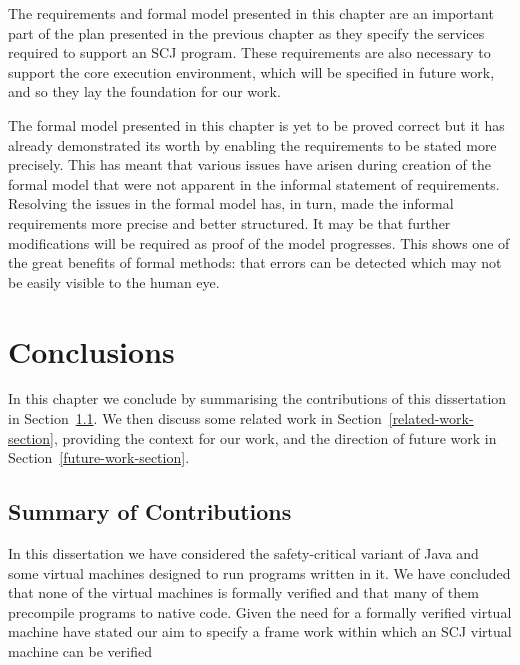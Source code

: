 \documentclass[a4paper,10pt]{report}
\begin{document}
The requirements and formal model presented in this chapter are an important
part of the plan presented in the previous chapter as they specify the services
required to support an SCJ program.  These requirements are also necessary to
support the core execution environment, which will be specified in future work,
and so they lay the foundation for our work.

The formal model presented in this chapter is yet to be proved correct but it
has already demonstrated its worth by enabling the requirements to be stated
more precisely.  This has meant that various issues have arisen during creation
of the formal model that were not apparent in the informal statement of
requirements.  Resolving the issues in the formal model has, in turn, made the
informal requirements more precise and better structured.  It may be that
further modifications will be required as proof of the model progresses.  This
shows one of the great benefits of formal methods: that errors can be detected
which may not be easily visible to the human eye.


\chapter{Conclusions}
\label{conclusions-chapter}

In this chapter we conclude by summarising the contributions of this
dissertation in Section~\ref{summary-section}.  We then discuss some related
work in Section~\ref{related-work-section}, providing the context for our work,
and the direction of future work in Section~\ref{future-work-section}.

\section{Summary of Contributions}
\label{summary-section}

In this dissertation we have considered the safety-critical variant of Java and
some virtual machines designed to run programs written in it.  We have concluded
that none of the virtual machines is formally verified and that many of them
precompile programs to native code.  Given the need for a formally verified
virtual machine have stated our aim to specify a frame work within which an SCJ
virtual machine can be verified
\end{document}
